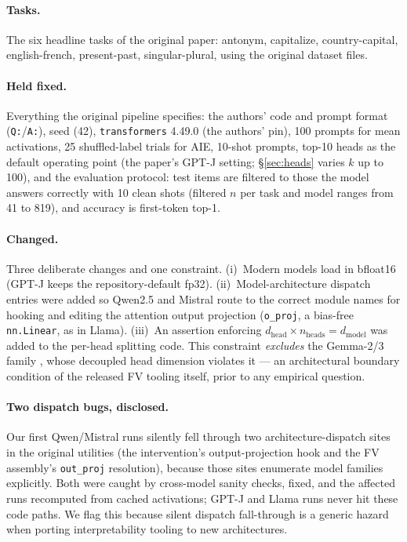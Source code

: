 \documentclass[11pt]{article}
\begin{document}
\paragraph{Tasks.} The six headline tasks of the original paper: antonym,
capitalize, country-capital, english-french, present-past, singular-plural,
using the original dataset files.

\paragraph{Held fixed.} Everything the original pipeline specifies: the
authors' code and prompt format (\texttt{Q:}/\texttt{A:}), seed (42),
\texttt{transformers} 4.49.0 (the authors' pin), 100 prompts for mean
activations, 25 shuffled-label trials for AIE, 10-shot prompts, top-10 heads
as the default operating point (the paper's GPT-J setting;
\S\ref{sec:heads} varies $k$ up to 100), and the evaluation protocol: test items are
filtered to those the model answers correctly with 10 clean shots (filtered
$n$ per task and model ranges from 41 to 819), and accuracy is first-token
top-1.

\paragraph{Changed.} Three deliberate changes and one constraint.
(i)~Modern models load in bfloat16 (GPT-J keeps the repository-default
fp32). (ii)~Model-architecture dispatch entries were added so Qwen2.5 and
Mistral route to the correct module names for hooking and editing the
attention output projection (\texttt{o\_proj}, a bias-free
\texttt{nn.Linear}, as in Llama). (iii)~An assertion enforcing
$d_{\text{head}} \times n_{\text{heads}} = d_{\text{model}}$ was added to
the per-head splitting code. This constraint \emph{excludes} the
Gemma-2/3 family \citep{gemmateam2024gemma2}, whose decoupled head
dimension violates it --- an architectural boundary condition of the
released FV tooling itself, prior to any empirical question.

\paragraph{Two dispatch bugs, disclosed.} Our first Qwen/Mistral runs
silently fell through two architecture-dispatch sites in the original
utilities (the intervention's output-projection hook and the FV assembly's
\texttt{out\_proj} resolution), because those sites enumerate model families
explicitly. Both were caught by cross-model sanity checks, fixed, and the
affected runs recomputed from cached activations; GPT-J and Llama runs never
hit these code paths. We flag this because silent dispatch fall-through is a
generic hazard when porting interpretability tooling to new architectures.
\end{document}
